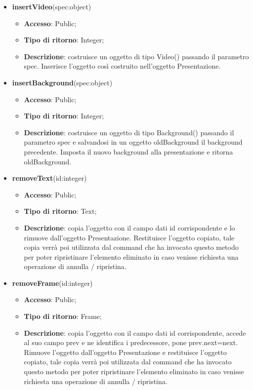 {\begin{itemize}
\begin{itemize}
			\end{itemize}
			\item \textbf{insertVideo}(spec:object)
			\begin{itemize}
				\item \textbf{Accesso}: Public;
				\item \textbf{Tipo di ritorno}: Integer;
				\item \textbf{Descrizione}: costruisce un oggetto di tipo Video() passando il parametro spec. Inserisce l’oggetto così costruito nell’oggetto Presentazione.
			\end{itemize}
			\item \textbf{insertBackground}(spec:object)
			\begin{itemize}
				\item \textbf{Accesso}: Public;
				\item \textbf{Tipo di ritorno}: Integer;
				\item \textbf{Descrizione}: costruisce un oggetto di tipo Background() passando il parametro spec e salvandosi in un oggetto oldBackground il background precedente. Imposta il nuovo background alla presentazione e ritorna oldBackground.
			\end{itemize}
			\item \textbf{removeText}(id:integer)
			\begin{itemize}
				\item \textbf{Accesso}: Public;
				\item \textbf{Tipo di ritorno}: Text;
				\item \textbf{Descrizione}: copia l’oggetto con il campo dati id corrispondente e lo rimuove dall’oggetto Presentazione. Restituisce l’oggetto copiato, tale copia verrà poi utilizzata dal command che ha invocato questo metodo per poter ripristinare l'elemento eliminato in caso venisse richiesta una operazione di annulla / ripristina.
			\end{itemize}
			\item \textbf{removeFrame}(id:integer)
			\begin{itemize}
				\item \textbf{Accesso}: Public;
				\item \textbf{Tipo di ritorno}: Frame;
				\item \textbf{Descrizione}: copia l’oggetto con il campo dati id corrispondente, accede al suo campo prev e ne identifica i predecessore, pone prev.next=next. Rimuove l’oggetto dall’oggetto Presentazione e restituisce l’oggetto copiato, tale copia verrà poi utilizzata dal command che ha invocato questo metodo per poter ripristinare l'elemento eliminato in caso venisse richiesta una operazione di annulla / ripristina.

\end{itemize}
\end{itemize}}
